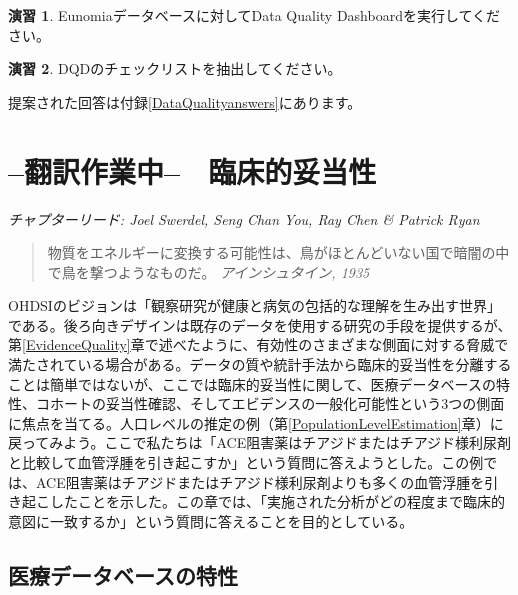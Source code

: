 \documentclass[
  11pt]{book}
\theoremstyle{definition}
\theoremstyle{definition}
\theoremstyle{definition}
\newtheorem{exercise}{演習}[chapter]
\theoremstyle{definition}
\theoremstyle{remark}
\begin{document}
\begin{exercise}
\protect\hypertarget{exr:exerciseRunDQD}{}\label{exr:exerciseRunDQD}Eunomiaデータベースに対してData Quality Dashboardを実行してください。
\end{exercise}

\begin{exercise}
\protect\hypertarget{exr:exerciseViewDQD}{}\label{exr:exerciseViewDQD}DQDのチェックリストを抽出してください。
\end{exercise}

提案された回答は付録\ref{DataQualityanswers}にあります。

\chapter{--翻訳作業中--　臨床的妥当性}\label{ClinicalValidity}

\emph{チャプターリード: Joel Swerdel, Seng Chan You, Ray Chen \& Patrick Ryan}

\begin{quote}
物質をエネルギーに変換する可能性は、鳥がほとんどいない国で暗闇の中で鳥を撃つようなものだ。 \emph{アインシュタイン, 1935}
\end{quote}

OHDSIのビジョンは「観察研究が健康と病気の包括的な理解を生み出す世界」である。後ろ向きデザインは既存のデータを使用する研究の手段を提供するが、第\ref{EvidenceQuality}章で述べたように、有効性のさまざまな側面に対する脅威で満たされている場合がある。データの質や統計手法から臨床的妥当性を分離することは簡単ではないが、ここでは臨床的妥当性に関して、医療データベースの特性、コホートの妥当性確認、そしてエビデンスの一般化可能性という3つの側面に焦点を当てる。人口レベルの推定の例（第\ref{PopulationLevelEstimation}章）に戻ってみよう。ここで私たちは「ACE阻害薬はチアジドまたはチアジド様利尿剤と比較して血管浮腫を引き起こすか」という質問に答えようとした。この例では、ACE阻害薬はチアジドまたはチアジド様利尿剤よりも多くの血管浮腫を引き起こしたことを示した。この章では、「実施された分析がどの程度まで臨床的意図に一致するか」という質問に答えることを目的としている。

\section{医療データベースの特性}\label{CharacteristicsOfDatabase}
\end{document}
